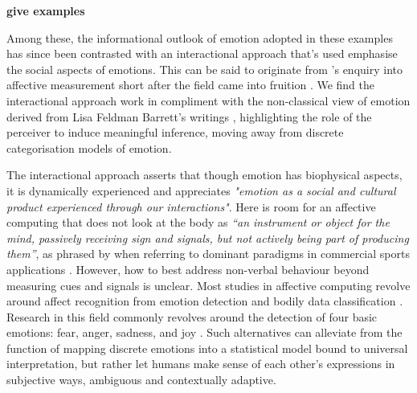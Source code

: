 \textbf{give examples}

Among these, the informational outlook of emotion adopted in these examples has since been contrasted with an interactional approach that's used emphasise the social aspects of emotions. This can be said to originate from \citeauthor{boehner_how_2007}'s enquiry into affective measurement short after the field came into fruition \cite{boehner_how_2007,boehner_affect_2005}. We find the interactional approach work in compliment with the non-classical view of emotion derived from Lisa Feldman Barrett's writings \cite{barrett_how_2017}, highlighting the role of the perceiver to induce meaningful inference, moving away from discrete categorisation models of emotion.

The interactional approach asserts that though emotion has biophysical aspects, it is dynamically experienced and appreciates \textit{"emotion as a social and cultural product experienced through our interactions"}. Here is room for an affective computing that does not look at the body as \textit{“an instrument or object for the mind, passively receiving sign and signals, but not actively being part of producing them”}, as phrased by \citeauthor{hook_kristina_affective_2012} when referring to dominant paradigms in commercial sports applications \cite{hook_kristina_affective_2012}. However, how to best address non-verbal behaviour beyond measuring cues and signals is unclear. Most studies in affective computing revolve around affect recognition from emotion detection and bodily data classification \cite{bota_review_2019}. Research in this field commonly revolves around the detection of four basic emotions: fear, anger, sadness, and joy \cite{picard_mit_nodate}. Such alternatives can alleviate from the function of mapping discrete emotions into a statistical model bound to universal interpretation, but rather let humans make sense of each other's expressions in subjective ways, ambiguous and contextually adaptive.





